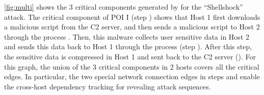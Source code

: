 \cref{fig:multi} shows the 3 critical components generated by \tool for the ``Shellshock'' attack. 
The critical component of POI I (step ) shows that Host 1 first downloads a malicious script from the C2 server, and then sends a malicious script  to Host 2 through the process . 
Then, this malware collects user sensitive data in Host 2 and sends this data back to Host 1 through the process  (step ). 
After this step, the sensitive data is compressed in Host 1 and sent back to the C2 server (). 
For this graph, the union of the 3 critical components in 2 hosts covers all the critical edges.
In particular, the two special network connection edges in steps  and  enable the cross-host dependency tracking for revealing attack sequences.





  
